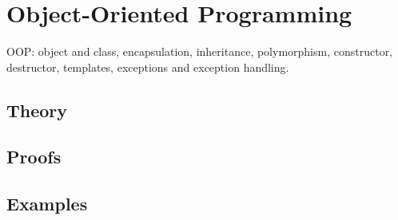 
\section{Object-Oriented Programming}
\label{sec:2.3b.07-oop}

\begin{ticket}
OOP: object and class, encapsulation, inheritance, polymorphism, constructor, destructor, templates, exceptions and exception handling.
\end{ticket}

\subsection*{Theory}

\subsection*{Proofs}

\subsection*{Examples}
